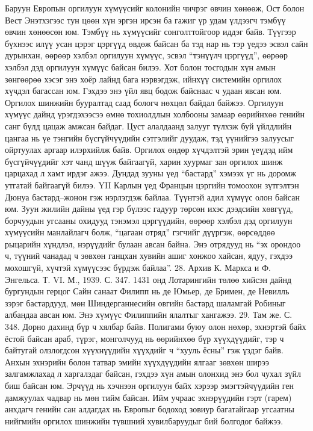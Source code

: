 Баруун Европын оргилуун хүмүүсийг колонийн чичрэг өвчин хөнөөж, Ост болон Вест Энэтхэгээс тун цөөн хүн эргэн ирсэн ба гажиг үр удам үлдээгч тэмбүү өвчин хөнөөсөн юм. Тэмбүү нь хүмүүсийг сонголттойгоор иддэг байв. Түүгээр бүхнээс илүү усан цэрэг цэргүүд өвдөж байсан ба тэд нар нь тэр үедээ эсвэл сайн дурынхан, өөрөөр хэлбэл оргилуун хүмүүс, эсвэл “тэнүүлч цэргүүд”, өөрөөр хэлбэл дэд оргилуун хүмүүс байсан билээ. Хот болон тосгодын хүн амын зөнгөөрөө хэсэг энэ хоёр лайнд бага нэрвэгдэж, ийнхүү системийн оргилох хүчдэл багассан юм. Гэхдээ энэ үйл явц бодож байснаас ч удаан явсан юм. Оргилох шинжийн бууралтад саад бологч нөхцөл байдал байжээ.
Оргилуун хүмүүс дайнд үрэгдэхээсээ өмнө тохиолдлын холбооны замаар өөрийнхөө генийн санг бүлд цацаж амжсан байдаг. Цуст алалдаанд залууг түлхэж буй үйлдлийн цангаа нь үе тэнгийн бүсгүйчүүдийн сэтгэлийг дуудаж, тэд үүнийгээ залуусыг ойртуулах аргаар илэрхийлж байв. Оргилох өндөр хүчдэлтэй эрин үеүдэд ийм бүсгүйчүүдийг хэт чанд шүүж байгаагүй, харин хуурмаг зан оргилох шинж царцахад л хамт ирдэг ажээ. Дундад зууны үед “бастард” хэмээх үг нь доромж утгатай байгаагүй билээ. YII Карлын үед Францын цэргийн томоохон зүтгэлтэн Дюнуа бастард–жонон гэж нэрлэгдэж байлаа. Түүнтэй адил хүмүүс олон байсан юм. Зуун жилийн дайны үед гэр бүлээс гадуур төрсөн ихэс дээдсийн хөвгүүд, борчуудын угсааны охидууд тэнэмэл цэргүүдийн, өөрөөр хэлбэл дэд оргилуун хүмүүсийн манлайлагч болж, “цагаан отряд” гэгчийг дүүргэж, өөрсөддөө рыцарийн хүндлэл, нэрүүдийг булаан авсан байна. Энэ отрядууд нь “эх орондоо ч, түүний чанадад ч зөвхөн ганцхан хувийн ашиг хонжоо хайсан, ядуу, гэхдээ мохошгүй, хүчтэй хүмүүсээс бүрдэж байлаа”. 28. Архив К. Маркса и Ф. Энгельса. Т. VI. М., 1939. С. 347.
1431 онд Лотарингийн төлөө хийсэн дайнд бургундын герцог Сайн санаат Филипп нь де Юмьер, де Бримен, де Невилль зэрэг бастардууд, мөн Шиндерганнесийн овгийн бастард шаламгай Робиныг албандаа авсан юм. Энэ хүмүүс Филиппийн ялалтыг хангажээ. 29. Там же. С. 348.
Дорно дахинд бүр ч хялбар байв. Полигами буюу олон нөхөр, эхнэртэй байх ёстой байсан араб, түрэг, монголчууд нь өөрийнхөө бүр хүүхдүүдийг, тэр ч байтугай олзлогдсон хүүхнүүдийн хүүхдийг ч “хууль ёсны” гэж үздэг байв. Анхын эхнэрийн болон татвар эмийн хүүхдүүдийн ялгааг зөвхөн ширээ залгамжлахад л харгалздаг байсан, гэхдээ хүн амын олонхид энэ бол чухал зүйл биш байсан юм. Эрчүүд нь хэчнээн оргилуун байх хэрээр эмэгтэйчүүдийн ген дамжуулах чадвар нь мөн тийм байсан. Ийм учраас эхнэрүүдийн гэрт (гарем) анхдагч генийн сан алдагдах нь Европыг бодоход зовиур багатайгаар угсаатны нийгмийн оргилох шинжийн түвшний хувилбаруудыг бий болгодог байжээ.

